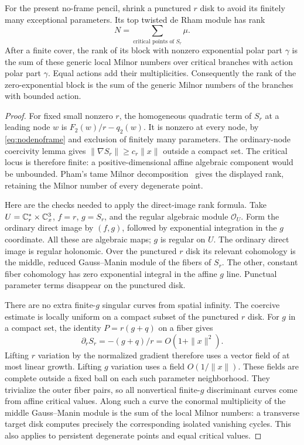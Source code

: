 \begin{lemma}
\label{lem:tamepencilrank}
For the present no-frame pencil, shrink a punctured $r$ disk to
avoid its finitely many exceptional parameters. Its top twisted
de Rham module has rank
\[
 N=\sum_{\text{critical points of }S_r}\mu.
\]
After a finite cover, the rank of its block with nonzero
exponential polar part $\gamma$ is the sum of these generic local
Milnor numbers over critical branches with action polar part
$\gamma$. Equal actions add their multiplicities. Consequently
the rank of the zero-exponential block is the sum of the generic
Milnor numbers of the branches with bounded action.
\end{lemma}
\begin{proof}
For fixed small nonzero $r$, the homogeneous quadratic term of
$S_r$ at a leading node $w$ is $F_2(w)/r-q_2(w)$. It is nonzero
at every node, by \eqref{eq:nodenoframe} and exclusion of finitely
many parameters. The ordinary-node coercivity lemma gives
$\|\nabla S_r\|\ge c_r\|x\|$ outside a compact set. The
critical locus is therefore finite: a positive-dimensional affine
algebraic component would be unbounded. Pham's tame Milnor
decomposition~\cite[Part~I, Sections~1--4]{Pham} gives the displayed
rank, retaining the Milnor number of every degenerate point.

Here are the checks needed to apply the direct-image rank formula.
Take $U=\mathbb C_r^*\times\mathbb C_x^3$, $f=r$, $g=S_r$, and the regular
algebraic module $\mathcal O_U$. Form the ordinary direct image
by $(f,g)$, followed by exponential integration in the $g$
coordinate. All these are algebraic maps; $g$ is regular on $U$.
The ordinary direct image is regular holonomic. Over the punctured
$r$ disk its relevant cohomology is the middle, reduced
Gauss--Manin module of the fibers of $S_r$. The other, constant
fiber cohomology has zero exponential integral in the affine $g$
line. Punctual parameter terms disappear on the punctured disk.

There are no extra finite-$g$ singular curves from spatial infinity.
The coercive estimate is locally uniform on a compact subset of
the punctured $r$ disk. For $g$ in a compact set, the identity
$P=r(g+q)$ on a fiber gives
\[
 \partial_r S_r=-(g+q)/r=O(1+\|x\|^2).
\]
Lifting $r$ variation by the normalized gradient therefore uses a
vector field of at most linear growth. Lifting $g$ variation uses
a field $O(1/\|x\|)$. These fields are complete outside a fixed
ball on each such parameter neighborhood. They trivialize the
outer fiber pairs, so all nonvertical finite-$g$ discriminant
curves come from affine critical values. Along such a curve the
conormal multiplicity of the middle Gauss--Manin module is the
sum of the local Milnor numbers: a transverse target disk computes
precisely the corresponding isolated vanishing cycles. This also
applies to persistent degenerate points and equal critical values.


\end{proof}
